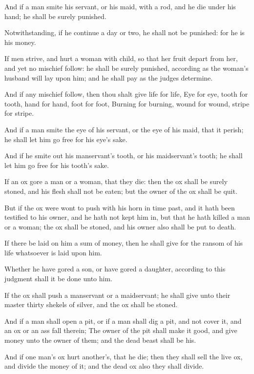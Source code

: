 \verse And if a man smite his servant, or his maid, with a rod, and he die under his hand; he shall be surely punished.

\verse Notwithstanding, if he continue a day or two, he shall not be punished: for he is his money.

\verse If men strive, and hurt a woman with child, so that her fruit depart from her, and yet no mischief follow: he shall be surely punished, according as the woman's husband will lay upon him; and he shall pay as the judges determine.

\verse And if any mischief follow, then thou shalt give life for life, \verse Eye for eye, tooth for tooth, hand for hand, foot for foot, \verse Burning for burning, wound for wound, stripe for stripe.

\verse And if a man smite the eye of his servant, or the eye of his maid, that it perish; he shall let him go free for his eye's sake.

\verse And if he smite out his manservant's tooth, or his maidservant's tooth; he shall let him go free for his tooth's sake.

\verse If an ox gore a man or a woman, that they die: then the ox shall be surely stoned, and his flesh shall not be eaten; but the owner of the ox shall be quit.

\verse But if the ox were wont to push with his horn in time past, and it hath been testified to his owner, and he hath not kept him in, but that he hath killed a man or a woman; the ox shall be stoned, and his owner also shall be put to death.

\verse If there be laid on him a sum of money, then he shall give for the ransom of his life whatsoever is laid upon him.

\verse Whether he have gored a son, or have gored a daughter, according to this judgment shall it be done unto him.

\verse If the ox shall push a manservant or a maidservant; he shall give unto their master thirty shekels of silver, and the ox shall be stoned.

\verse And if a man shall open a pit, or if a man shall dig a pit, and not cover it, and an ox or an ass fall therein; \verse The owner of the pit shall make it good, and give money unto the owner of them; and the dead beast shall be his.

\verse And if one man's ox hurt another's, that he die; then they shall sell the live ox, and divide the money of it; and the dead ox also they shall divide.


